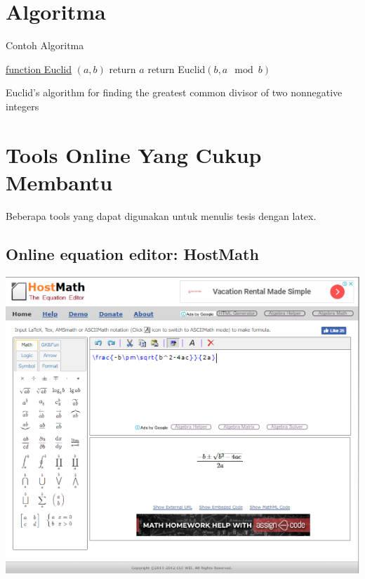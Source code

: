 \section{Algoritma}
Contoh Algoritma

\begin{algorithm}[H]
	
	\underline{function Euclid} $(a,b)$\;
	{
		return $a$\;
	}
	{
		return Euclid$(b,a\mod b)$\;
	}
	\caption{Euclid's algorithm for finding the greatest common divisor of two nonnegative integers}
\end{algorithm}
\newpage
\section{Tools Online Yang Cukup Membantu}
Beberapa tools yang dapat digunakan untuk menulis tesis dengan latex.
\subsection{Online equation editor: HostMath }
\begin{center}
	\includegraphics[width=1\linewidth]{bab2/Hosmath}
	\label{fig:hosmath}
\end{center}




\newpage
